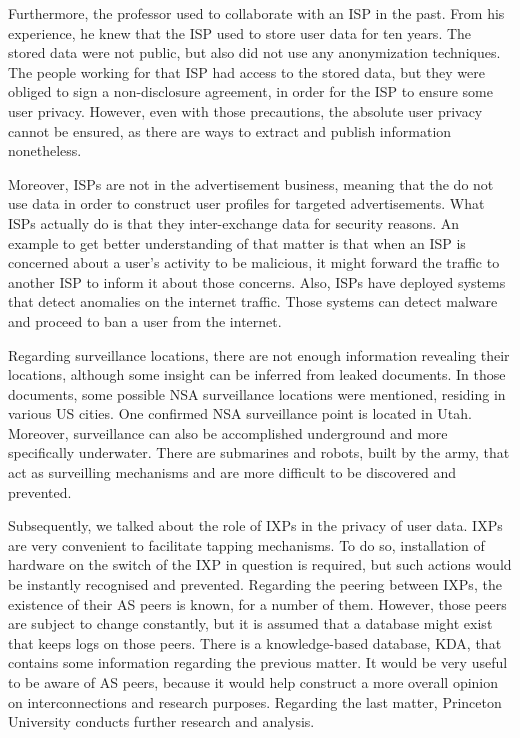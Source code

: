 Furthermore, the professor used to collaborate with an ISP in the past. From his 
experience, he knew that the ISP used to store user data for ten years. The 
stored data were not public, but also did not use any anonymization techniques. 
The people working for that ISP had access to the stored data, but they were 
obliged to sign a non-disclosure agreement, in order for the ISP to ensure some 
user privacy. However, even with those precautions, the absolute user privacy 
cannot be ensured, as there are ways to extract and publish information 
nonetheless. 

Moreover, ISPs are not in the advertisement business, meaning that the do not 
use data in order to construct user profiles for targeted advertisements. What 
ISPs actually do is that they inter-exchange data for security reasons. An 
example to get better understanding of that matter is that when an ISP is 
concerned about a user's activity to be malicious, it might forward the traffic 
to another ISP to inform it about those concerns. Also, ISPs have deployed 
systems that detect anomalies on the internet traffic. Those systems can detect 
malware and proceed to ban a user from the internet.

Regarding surveillance locations, there are not enough information revealing 
their locations, although some insight can be inferred from leaked documents. 
In those documents, some possible NSA surveillance locations were mentioned, 
residing in various US cities. One confirmed NSA surveillance point is located 
in Utah. Moreover, surveillance can also be accomplished underground and more 
specifically underwater. There are submarines and robots, built by the army, 
that act as surveilling mechanisms and are more difficult to be discovered and 
prevented.

Subsequently, we talked about the role of IXPs in the privacy of user data. IXPs 
are very convenient to facilitate tapping mechanisms. To do so, installation of 
hardware on the switch of the IXP in question is required, but such actions 
would be instantly recognised and prevented. Regarding the peering between IXPs, 
the existence of their AS peers is known, for a number of them. However, those 
peers are subject to change constantly, but it is assumed that a database might 
exist that keeps logs on those peers. There is a knowledge-based database, KDA, 
that contains some information regarding the previous matter. It would be very 
useful to be aware of AS peers, because it would help construct a more overall 
opinion on interconnections and research purposes. Regarding the last matter, 
Princeton University conducts further research and analysis.

